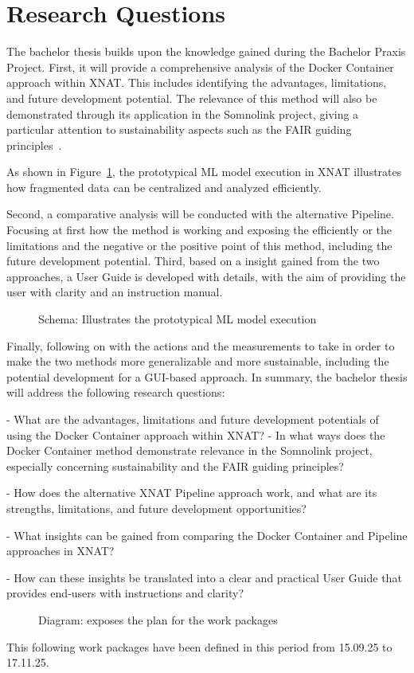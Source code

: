 \section{Research Questions}

The bachelor thesis builds upon the knowledge gained during the Bachelor Praxis Project.
 First, it will provide a comprehensive analysis of the Docker Container approach within XNAT. This includes identifying the advantages, limitations, and future development potential.
 The relevance of this method will also be demonstrated through its application in the Somnolink project, giving a particular attention to sustainability aspects such as the FAIR guiding principles~\cite{wilkinson_fair_2016}.

 As shown in Figure~\ref{fig:diagram-core-libraries}, the prototypical ML model execution in XNAT illustrates how fragmented data can be centralized and analyzed efficiently.

Second, a comparative analysis will be conducted with the alternative Pipeline. Focusing at first how the method is working and exposing the efficiently or the limitations and the negative or the positive point of this method, including the future development potential.  
Third, based on a insight gained from the two approaches, a User Guide is developed with details, with the aim of providing the user with clarity and an instruction manual.


\begin{figure}[H]
  \centering
  \def\svgwidth{0.8\linewidth}
  
  \caption{Schema: Illustrates the prototypical ML model execution }
  \label{fig:diagram-core-libraries}
\end{figure}


Finally, following on with the actions and the measurements to take in order to make the two methods more generalizable and more sustainable, including the potential development for a GUI-based approach.   
In summary, the bachelor thesis will address the following research questions:

- What are the advantages, limitations and future development potentials of using the Docker Container approach within XNAT?
- In what ways does the Docker Container method demonstrate relevance in the Somnolink project, especially concerning sustainability and the FAIR guiding principles?

- How does the alternative XNAT Pipeline approach work, and what are its strengths, limitations, and future development opportunities?

- What insights can be gained from comparing the Docker Container and Pipeline approaches in XNAT?

- How can these insights be translated into a clear and practical User Guide that provides end-users with instructions and clarity?


\begin{figure}[ht]
  \centering
  \def\svgwidth{1.1\linewidth}
  
  \caption{Diagram: exposes the plan for the work packages}
\end{figure}

This following work packages have been defined in this period from 15.09.25 to 17.11.25.
